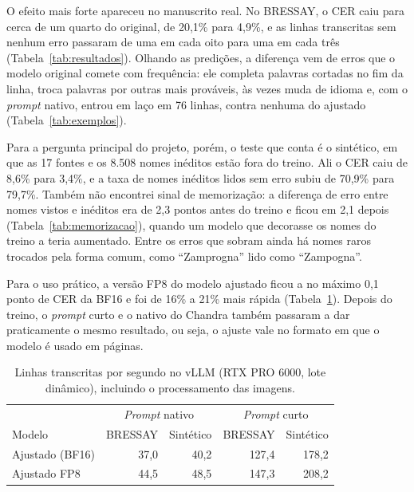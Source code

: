 \documentclass[12pt,a4paper]{article}
\begin{document}
O efeito mais forte apareceu no manuscrito real. No BRESSAY, o CER caiu para cerca de um quarto do original, de 20,1\% para 4,9\%, e as linhas transcritas sem nenhum erro passaram de uma em cada oito para uma em cada três (Tabela~\ref{tab:resultados}). Olhando as predições, a diferença vem de erros que o modelo original comete com frequência: ele completa palavras cortadas no fim da linha, troca palavras por outras mais prováveis, às vezes muda de idioma e, com o \emph{prompt} nativo, entrou em laço em 76 linhas, contra nenhuma do ajustado (Tabela~\ref{tab:exemplos}).

Para a pergunta principal do projeto, porém, o teste que conta é o sintético, em que as 17 fontes e os 8.508 nomes inéditos estão fora do treino. Ali o CER caiu de 8,6\% para 3,4\%, e a taxa de nomes inéditos lidos sem erro subiu de 70,9\% para 79,7\%. Também não encontrei sinal de memorização: a diferença de erro entre nomes vistos e inéditos era de 2,3 pontos antes do treino e ficou em 2,1 depois (Tabela~\ref{tab:memorizacao}), quando um modelo que decorasse os nomes do treino a teria aumentado. Entre os erros que sobram ainda há nomes raros trocados pela forma comum, como ``Zamprogna'' lido como ``Zampogna''.

Para o uso prático, a versão FP8 do modelo ajustado ficou a no máximo 0,1 ponto de CER da BF16 e foi de 16\% a 21\% mais rápida (Tabela~\ref{tab:velocidade}). Depois do treino, o \emph{prompt} curto e o nativo do Chandra também passaram a dar praticamente o mesmo resultado, ou seja, o ajuste vale no formato em que o modelo é usado em páginas.

\begin{table}[H]
\centering
\small
\begin{tabular}{@{}lrrrr@{}}
\toprule
& \multicolumn{2}{c}{\emph{Prompt} nativo} & \multicolumn{2}{c}{\emph{Prompt} curto} \\
Modelo & BRESSAY & Sintético & BRESSAY & Sintético \\
\midrule
Ajustado (BF16) & 37,0 & 40,2 & 127,4 & 178,2 \\
Ajustado FP8 & 44,5 & 48,5 & 147,3 & 208,2 \\
\bottomrule
\end{tabular}
\caption{Linhas transcritas por segundo no vLLM (RTX PRO 6000, lote dinâmico), incluindo o processamento das imagens.}
\label{tab:velocidade}
\end{table}
\end{document}
